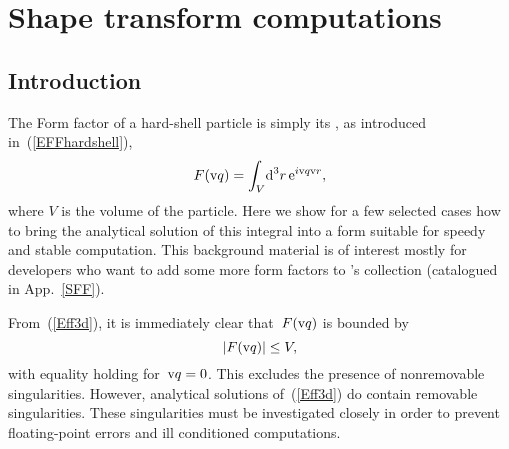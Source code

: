 
\chapter{Shape transform computations}  \label{SFFcomp}


\section{Introduction}\label{SShapeTrafIntro}

The Form factor of a hard-shell particle is simply its ,
as introduced in~(\ref{EFFhardshell}),
\begin{equation}\label{Eff3d}
  F(\text{v}{q})=\int_V\!\text{d}^3r\, \text{e}^{i\text{v}{q}\text{v}{r}},
\end{equation}
where $V$ is the volume of the particle.
Here we show for a few selected cases
how to bring the analytical solution of this integral into a form
 suitable for speedy and stable computation.
This background material is of interest mostly for
developers who want to add some more form factors to \BornAgain's collection
(catalogued in App.~\ref{SFF}).

%
From~(\ref{Eff3d}), it is immediately clear that~$F(\text{v}{q})$ is bounded by
\begin{equation}
  |F(\text{v}{q})|\le V,
\end{equation}
with equality holding for~$\text{v}{q}=0$.
This excludes the presence of nonremovable singularities.
However, analytical solutions of~(\ref{Eff3d}) do contain
removable singularities.
These singularities must be investigated closely
in order to prevent floating-point errors and ill conditioned computations.

